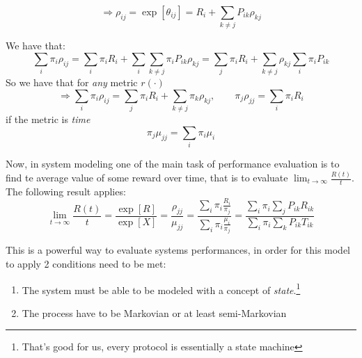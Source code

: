 \begin{equation}
\Rightarrow\rho_{ij} = \exp[\theta_{ij}] =  R_i + \sum_{k \neq j}P_{ik}\rho_{kj}
\end{equation}


We have that:
\begin{equation*}
\sum_i \pi_i \rho_{ij} = \sum_i \pi_i R_i + \sum_i \sum_{k \neq j} \pi_i P_{ik} \rho_{kj} = \sum_j \pi_i R_i + \sum_{k \neq j}\rho_{kj}\sum_i\pi_i P_{ik}
\end{equation*}
So we have that for \emph{any} metric $r(\cdot)$
\begin{equation}
\Rightarrow\sum_i \pi_i \rho_{ij} = \sum_j \pi_i R_i + \sum_{k \neq j}\pi_k\rho_{kj},\qquad \pi_j\rho_{jj} = \sum_i \pi_i R_i
\end{equation}
if the metric is \emph{time}
\begin{equation}
\pi_j \mu_{jj} = \sum_i \pi_i \mu_i
\end{equation}

Now, in system modeling one of the main task of performance evaluation is to find te average value of some reward over time, that is to evaluate $\lim_{t \to \infty}\frac{R(t)}{t}$. The following result applies:
\begin{equation}
\lim_{t \to \infty}\frac{R(t)}{t} = \frac{\exp[R]}{\exp[X]} = \frac{\rho_{jj}}{\mu_{jj}} = \frac{\sum_i \pi_i \frac{R_i}{\pi_j}}{\sum_i \pi_i \frac{\mu_i}{\pi_j}} = \frac{\sum_i \pi_i \sum_j P_{ik} R_{ik}}{\sum_i \pi_i \sum_k P_{ik}T_{ik}}
\end{equation}

This is a powerful way to evaluate systems performances, in order for this model to apply 2 conditions need to be met:
\begin{enumerate}
	\item The system must be able to be modeled with a concept of \emph{state}.\footnote{That's good for us, every protocol is essentially a state machine}
	\item The process have to be Markovian or at least semi-Markovian
\end{enumerate}
